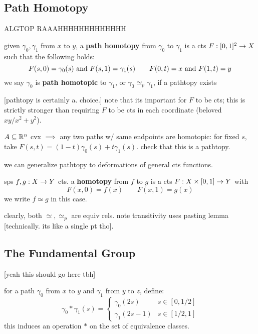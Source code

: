 \subsection{Path Homotopy}
ALGTOP RAAAHHHHHHHHHHHHH

\begin{defn}
    given $\gamma_{0},\gamma_{1}$ from $x$ to $y$, a \textbf{path homotopy}
    from $\gamma_{0}$ to $\gamma_{1}$ is a cts $F:[0,1]^{2}\rightarrow X$ such that
    the following holds:
    \begin{equation*}
        F(s,0)=\gamma_{0}(s) \textrm{ and } F(s,1)=\gamma_{1}(s) \qquad
        F(0,t)=x \textrm{ and } F(1,t)=y
    \end{equation*}
    we say $\gamma_{0}$ is \textbf{path homotopic} to $\gamma_{1}$,
    or $\gamma_{0}\simeq_{p}\gamma_{1}$, if a pathtopy exists
\end{defn}
[pathtopy is certainly a. choice.]
note that its important for $F$ to be cts; this is strictly stronger than
requiring $F$ to be cts in each coordinate (beloved $xy/x^{2}+y^{2}$).

\begin{xmp}[source=Primary Source Material]
    $A\subseteq\mathbb{R}^{n}$ cvx $\implies$ any two paths w/ same endpoints are
    homotopic: for fixed $s$, take $F(s,t)=(1-t)\gamma_{0}(s)+t\gamma_{1}(s)$.
    check that this is a pathtopy.
\end{xmp}

we can generalize pathtopy to deformations of general cts functions.
\begin{defn}
    sps $f,g:X\rightarrow Y$ cts.
    a \textbf{homotopy} from $f$ to $g$ is a cts $F:X\times[0,1]\rightarrow Y$ with
    \begin{equation*}
        F(x,0)=f(x) \qquad F(x,1) = g(x)
    \end{equation*}
    we write $f\simeq g$ in this case.
\end{defn}
clearly, both $\simeq, \simeq_{p}$ are equiv rels.
note transitivity uses pasting lemma [technically. its like a single pt tho].

\subsection{The Fundamental Group}
[yeah this should go here tbh]

\begin{defn}
    for a path $\gamma_{0}$ from $x$ to $y$ and $\gamma_{1}$ from $y$ to $z$,
    define:
    \begin{equation*}
        \gamma_{0}*\gamma_{1}(s) =
        \begin{cases}
            \gamma_{0}(2s) & s \in[0,1/2] \\
            \gamma_{1}(2s-1) & s \in[1/2,1]
        \end{cases}
    \end{equation*}
    this induces an operation $*$ on the set of equivalence classes.
\end{defn} \

